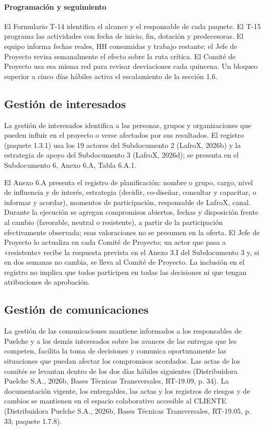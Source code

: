 \documentclass[carta,firma,final]{lafrox}
\begin{document}
\paragraph{Programación y seguimiento}
El Formulario T-14 identifica el alcance y el responsable de cada paquete. El T-15 programa las actividades con fecha de inicio, fin, dotación y predecesoras. El equipo informa fechas reales, HH consumidas y trabajo restante; el Jefe de Proyecto revisa semanalmente el efecto sobre la ruta crítica. El Comité de Proyecto usa esa misma red para revisar desviaciones cada quincena. Un bloqueo superior a cinco días hábiles activa el escalamiento de la sección 1.6.

\subsection{Gestión de interesados}

La gestión de interesados identifica a las personas, grupos y organizaciones que pueden influir en el proyecto o verse afectados por sus resultados. El registro (paquete 1.3.1) usa los 19 actores del Subdocumento 2 (LafroX, 2026b) y la estrategia de apoyo del Subdocumento 3 (LafroX, 2026d); se presenta en el Subdocumento 6, Anexo 6.A, Tabla 6.A.1.

El Anexo 6.A presenta el registro de planificación: nombre o grupo, cargo, nivel de influencia y de interés, estrategia (decidir, co-diseñar, consultar y capacitar, o informar y acordar), momentos de participación, responsable de LafroX, canal. Durante la ejecución se agregan compromisos abiertos, fechas y disposición frente al cambio (favorable, neutral o resistente), a partir de la participación efectivamente observada; esas valoraciones no se presumen en la oferta. El Jefe de Proyecto lo actualiza en cada Comité de Proyecto; un actor que pasa a «resistente» recibe la respuesta prevista en el Anexo 3.I del Subdocumento 3 y, si en dos semanas no cambia, se lleva al Comité de Proyecto. La inclusión en el registro no implica que todos participen en todas las decisiones ni que tengan atribuciones de aprobación.

\subsection{Gestión de comunicaciones}

La gestión de las comunicaciones mantiene informados a los responsables de Puelche y a los demás interesados sobre los avances de las entregas que les competen, facilita la toma de decisiones y comunica oportunamente las situaciones que puedan afectar los compromisos acordados. Las actas de los comités se levantan dentro de los dos días hábiles siguientes (Distribuidora Puelche S.A., 2026b, Bases Técnicas Transversales, RT-19.09, p. 34). La documentación vigente, los entregables, las actas y los registros de riesgos y de cambios se mantienen en el espacio colaborativo accesible al CLIENTE (Distribuidora Puelche S.A., 2026b, Bases Técnicas Transversales, RT-19.05, p. 33; paquete 1.7.8).
\end{document}
